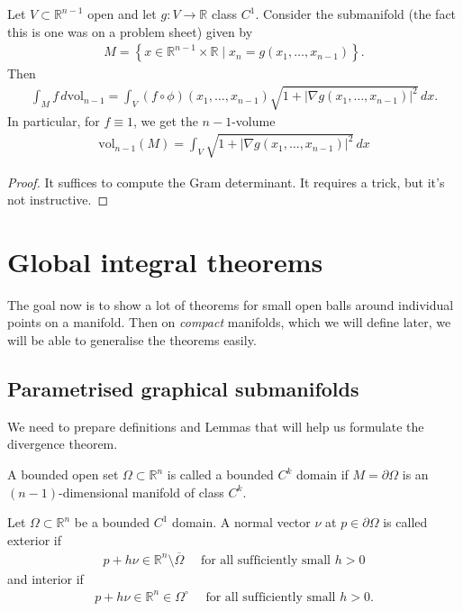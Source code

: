 
\begin{prop}\label{prop:int-graph-subm}
	Let $V \subset \mathbb{R}^{n-1}$ open and let $g: V \to \mathbb{R}$ class $C^{1}$. Consider the submanifold (the fact this is one was on a problem sheet) given by
	\begin{align*}
		M = \left\{ x \in \mathbb{R}^{n-1} \times \mathbb{R} \mid x_{n} = g(x_{1}, \dots, x_{n-1}) \right\}.
	\end{align*}
	Then
	\begin{align*}
		\int_{M}^{} f \, d \text{vol}_{n-1} = \int_{V}^{} (f \circ \phi)(x_{1}, \dots, x_{n-1}) \sqrt{1+\left|  \nabla g(x_{1}, \dots, x_{n-1})\right|^{2} } \, dx.
	\end{align*}
	In particular, for $f \equiv 1$, we get the $n-1$-volume
	\begin{align*}
		\text{vol}_{n-1}(M) = \int_{V}^{} \sqrt{1+ \left| \nabla g(x_{1}, \dots, x_{n-1}) \right|^{2}} \, dx
	\end{align*}
\end{prop}
\begin{proof}
	It suffices to compute the Gram determinant. It requires a trick, but it's not instructive.
\end{proof}

\chapter{Global integral theorems}

The goal now is to show a lot of theorems for small open balls around individual points on a manifold. Then on \textit{compact} manifolds, which we will define later, we will be able to generalise the theorems easily.

\section{Parametrised graphical submanifolds}

We need to prepare definitions and Lemmas that will help us formulate the divergence theorem.

\begin{definition}\label{def:bdd-ck-dom}
	A bounded open set $\Omega \subset \mathbb{R}^{n}$ is called a bounded $C^{k}$ domain if $M = \partial \Omega$ is an $(n-1)$-dimensional manifold of class $C^{k}$.
\end{definition}

\begin{definition}\label{def:ext-norm-map}
	Let $\Omega \subset \mathbb{R}^{n}$ be a bounded $C^{1}$ domain. A normal vector $\nu$ at $p \in \partial\Omega$ is called exterior if
	\begin{align*}
		p+h \nu \in \mathbb{R}^{n} \setminus \overline{ \Omega } \quad \text{ for all sufficiently small } h > 0
	\end{align*}
	and interior if
	\begin{align*}
		p+h \nu \in \mathbb{R}^{n} \in \Omega^{\circ} \quad \text{ for all sufficiently small } h > 0.
	\end{align*}
\end{definition}

